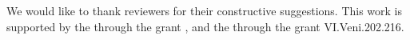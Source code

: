 \documentclass[sigplan,screen]{acmart}
\newcommand{\AK}[1]{\AgdaKeyword{#1}}
\begin{document}
%

\begin{acks}
We would like to thank reviewers for their constructive suggestions.
This work is supported by the  through
the grant , and the
through the grant VI.Veni.202.216.
\end{acks}


\end{document}
